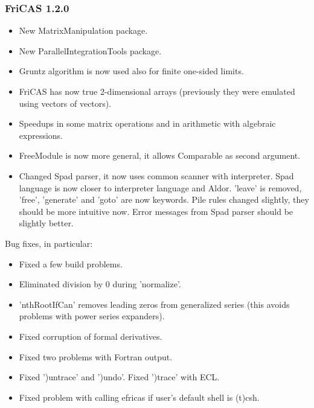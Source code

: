 \subsubsection{FriCAS 1.2.0}
\begin{itemize}
\item New MatrixManipulation package.

\item New ParallelIntegrationTools package.

\item Gruntz algorithm is now used also for finite one-sided limits.

\item FriCAS has now true 2-dimensional arrays (previously they were
emulated using vectors of vectors).

\item Speedups in some matrix operations and in arithmetic with
algebraic expressions.

\item FreeModule is now more general, it allows Comparable as second
argument.

\item Changed Spad parser, it now uses common scanner with
interpreter. Spad language is now closer to interpreter language and
Aldor. 'leave' is removed, 'free', 'generate' and 'goto' are now
keywords. Pile rules changed slightly, they should be more intuitive
now. Error messages from Spad parser should be slightly better.
\end{itemize}

Bug fixes, in particular:

\begin{itemize}
\item Fixed a few build problems.

\item Eliminated division by 0 during 'normalize'.

\item 'nthRootIfCan' removes leading zeros from generalized series
  (this avoids problems with power series expanders).

\item Fixed corruption of formal derivatives.

\item Fixed two problems with Fortran output.

\item Fixed ')untrace' and ')undo'. Fixed ')trace' with ECL.

\item Fixed problem with calling efricas if user's default shell is
  (t)csh.
\end{itemize}

